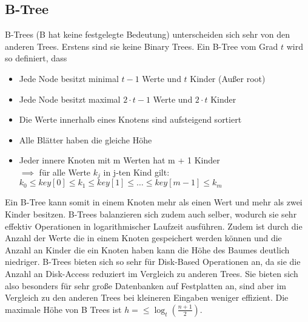 \documentclass[
../../AuD-Zusammenfassung.tex,
]
{subfiles}
\begin{document}
\subsection{B-Tree}
B-Trees (B hat keine festgelegte Bedeutung) unterscheiden sich sehr von den anderen Trees. Erstens sind sie keine Binary Trees. Ein B-Tree vom Grad $t$ wird so definiert, dass
\begin{itemize}
    \item Jede Node besitzt minimal $t - 1$ Werte und $t$ Kinder (Außer root)
    \item Jede Node besitzt maximal $2\cdot t - 1$ Werte und $2\cdot t$ Kinder
    \item Die Werte innerhalb eines Knotens sind aufsteigend sortiert
    \item Alle Blätter haben die gleiche Höhe
    \item Jeder innere Knoten mit m Werten hat m + 1 Kinder \\ $\implies$ für alle Werte $k_j$ in j-ten Kind gilt: $k_0 \leq key[0] \leq k_1 \leq key[1] \leq \ldots \leq key[m-1] \leq k_m $
\end{itemize}
Ein B-Tree kann somit in einem Knoten mehr als einen Wert und mehr als zwei Kinder besitzen. B-Trees balanzieren sich zudem auch selber, wodurch sie sehr effektiv Operationen in logarithmischer Laufzeit ausführen. Zudem ist durch die Anzahl der Werte die in einem Knoten gespeichert werden können und die Anzahl an Kinder die ein Knoten haben kann die Höhe des Baumes deutlich niedriger. B-Trees bieten sich so sehr für Disk-Based Operationen an, da sie die Anzahl an Disk-Access reduziert im Vergleich zu anderen Trees. Sie bieten sich also besonders für sehr große Datenbanken auf Festplatten an, sind aber im Vergleich zu den anderen Trees bei kleineren Eingaben weniger effizient.
Die maximale Höhe von B Trees ist $ h = \leq \log_t(\frac{n + 1}{2})$.

\end{document}
